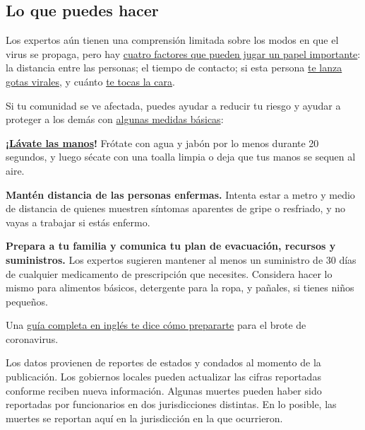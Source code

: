 \hypertarget{lo-que-puedes-hacer}{%
\subsection{Lo que puedes hacer}\label{lo-que-puedes-hacer}}

Los expertos aún tienen una comprensión limitada sobre los modos en que
el virus se propaga, pero hay
\href{https://www.nytimes3xbfgragh.onion/es/2020/03/03/espanol/ciencia-y-tecnologia/coronavirus-como-se-transmite.html}{cuatro
factores que pueden jugar un papel importante}: la distancia entre las
personas; el tiempo de contacto; si esta persona
\href{https://www.nytimes3xbfgragh.onion/es/2020/07/08/espanol/ciencia-y-tecnologia/coronavirus-aire-aerosoles.html}{te
lanza gotas virales}, y cuánto
\href{https://www.nytimes3xbfgragh.onion/es/2020/03/06/espanol/estilos-de-vida/no-te-toques-la-cara.html}{te
tocas la cara}.

Si tu comunidad se ve afectada, puedes ayudar a reducir tu riesgo y
ayudar a proteger a los demás con
\href{https://www.nytimes3xbfgragh.onion/es/article/el-coronavirus-proteger-preparar.html}{algunas
medidas básicas}:

\textbf{¡\href{https://www.nytimes3xbfgragh.onion/es/2020/03/19/espanol/ciencia-y-tecnologia/como-lavarse-las-manos-coronavirus.html}{Lávate
las manos}!} Frótate con agua y jabón por lo menos durante 20 segundos,
y luego sécate con una toalla limpia o deja que tus manos se sequen al
aire.

\textbf{Mantén distancia de las personas enfermas.} Intenta estar a
metro y medio de distancia de quienes muestren síntomas aparentes de
gripe o resfriado, y no vayas a trabajar si estás enfermo.

\textbf{Prepara a tu familia y comunica tu plan de evacuación, recursos
y suministros.} Los expertos sugieren mantener al menos un suministro de
30 días de cualquier medicamento de prescripción que necesites.
Considera hacer lo mismo para alimentos básicos, detergente para la
ropa, y pañales, si tienes niños pequeños.

Una
\href{https://www.nytimes3xbfgragh.onion/interactive/2020/world/coronavirus-tips-advice.html}{guía
completa en inglés te dice cómo prepararte} para el brote de
coronavirus.

Los datos provienen de reportes de estados y condados al momento de la
publicación. Los gobiernos locales pueden actualizar las cifras
reportadas conforme reciben nueva información. Algunas muertes pueden
haber sido reportadas por funcionarios en dos jurisdicciones distintas.
En lo posible, las muertes se reportan aquí en la jurisdicción en la que
ocurrieron.

